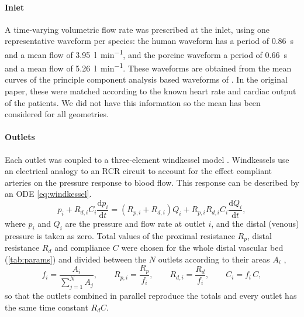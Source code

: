 \paragraph{Inlet}
A time-varying volumetric flow rate was prescribed at the inlet, using one representative waveform per species: the human waveform has a period of \SI{0.86}{\second} and a mean flow of \SI{3.95}{\litre\per\minute}, and the porcine waveform a period of \SI{0.66}{\second} and a mean flow of \SI{5.26}{\litre\per\minute}.
These waveforms are obtained from the mean curves of the principle component analysis based waveforms of \citet{yevtushenkoSimulationBasedComparisonHuman2025}.
In the original paper, these were matched according to the known heart rate and cardiac output of the patients.
We did not have this information so the mean has been considered for all geometries.


\paragraph{Outlets}
Each outlet was coupled to a three-element windkessel model \citep{westerhof2009arterial}.
Windkessels use an electrical analogy to an RCR circuit to account for the effect compliant arteries on the pressure response to blood flow.
This response can be described by an ODE \cref{eq:windkessel}.
\begin{equation}
  p_i + R_{d,i} C_i \frac{\mathrm{d}p_i}{\mathrm{d}t}
  = \left(R_{p,i} + R_{d,i}\right) Q_i + R_{p,i} R_{d,i} C_i \frac{\mathrm{d}Q_i}{\mathrm{d}t},
  \label{eq:windkessel}
\end{equation}
where $p_i$ and $Q_i$ are the pressure and flow rate at outlet $i$, and the distal (venous) pressure is taken as zero.
Total values of the proximal resistance $R_p$, distal resistance $R_d$ and compliance $C$ were chosen for the whole distal vascular bed (\cref{tab:params}) and divided between the $N$ outlets according to their areas $A_i$ \citep{yangEvolutionHemodynamicForces2019},
\begin{equation}
  f_i = \frac{A_i}{\sum_{j=1}^{N} A_j}, \qquad
  R_{p,i} = \frac{R_p}{f_i}, \qquad
  R_{d,i} = \frac{R_d}{f_i}, \qquad
  C_i = f_i\, C,
  \label{eq:wk-split}
\end{equation}
so that the outlets combined in parallel reproduce the totals and every outlet has the same time constant $R_d C$.

